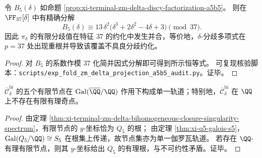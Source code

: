 \begin{proposition}\label{prop:xi-terminal-zm-delta-badprime-37-b5-double-root}
令 \(B_5(\delta)\) 如命题 \ref{prop:xi-terminal-zm-delta-discy-factorization-a5b5}。
则在 \(\FF_{37}[\delta]\) 中有精确分解
\[
B_5(\delta)\equiv 13\,\delta^2\bigl(\delta^3+2\delta^2-4\delta+3\bigr)\pmod{37}.
\]
因此 \(\pi_\delta\) 的有限分歧值在特征 \(37\) 的约化中发生并合，等价地，\(\delta\)-分歧多项式在 \(p=37\) 处出现重根并导致该覆盖不具良分歧约化。
\end{proposition}
\begin{proof}
对 \(B_5\) 的系数作模 \(37\) 化简并因式分解即可得到所示恒等式。
可复现核验脚本：\texttt{scripts/exp\_fold\_zm\_delta\_projection\_a5b5\_audit.py}。证毕。
\end{proof}

\begin{corollary}[有限节点集的伽罗瓦传递性]\label{cor:xi-terminal-zm-delta-nodes-single-galois-orbit}
\(\overline{\mathcal C}_\delta^{\mathrm{bi}}\) 的五个有限节点在 \(\operatorname{Gal}(\overline{\QQ}/\QQ)\) 作用下构成单一轨道；特别地，\(\overline{\mathcal C}_\delta^{\mathrm{bi}}\) 在 \(\QQ\) 上不存在有限有理奇点。
\end{corollary}

\begin{proof}
由定理 \ref{thm:xi-terminal-zm-delta-bihomogeneous-closure-singularity-spectrum}，有限节点的 \(y\)-坐标恰为 \(Q_5\) 的根；
由定理 \ref{thm:xi-q5-galois-s5}，\(\operatorname{Gal}(Q_5/\QQ)\cong S_5\) 在根集上传递，故节点集亦为单一伽罗瓦轨道。
若存在 \(\QQ\)-有理有限节点，则其 \(y\)-坐标给出 \(Q_5\) 的有理根，与不可约性矛盾。证毕。
\end{proof}



\endinput
